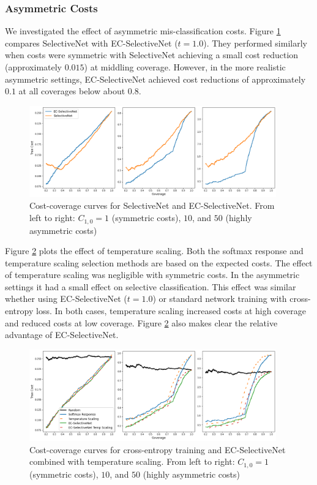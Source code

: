 \subsubsection{Asymmetric Costs}
We investigated the effect of asymmetric mis-classification costs. Figure \ref{fig:sn_costs} compares SelectiveNet with EC-SelectiveNet ($t=1.0$). They performed similarly when costs were symmetric with SelectiveNet achieving a small cost reduction (approximately $0.015$) at middling coverage. However, in the more realistic asymmetric settings, EC-SelectiveNet achieved cost reductions of approximately $0.1$ at all coverages below about $0.8$.

\begin{figure}[h]
	\centering
	\includegraphics[width=0.95\textwidth]{images/selectivenet_cost.png}
	\caption{Cost-coverage curves for SelectiveNet and EC-SelectiveNet. From left to right: $C_{1,0}=1$ (symmetric costs), $10$, and $50$ (highly asymmetric costs)}
	\label{fig:sn_costs}
\end{figure}

Figure \ref{fig:temp_scaling} plots the effect of temperature scaling. Both the softmax response and temperature scaling selection methods are based on the expected costs. The effect of temperature scaling was negligible with symmetric costs. In the asymmetric settings it had a small effect on selective classification. This effect was similar whether using EC-SelectiveNet ($t=1.0$) or standard network training with cross-entropy loss. In both cases, temperature scaling increased costs at high coverage and reduced costs at low coverage. Figure \ref{fig:temp_scaling} also makes clear the relative advantage of EC-SelectiveNet.

\begin{figure}[h]
	\centering
	\includegraphics[width=0.95\textwidth]{images/tmp_scaling_v2.png}
	\caption{Cost-coverage curves for cross-entropy training and EC-SelectiveNet combined with temperature scaling. From left to right: $C_{1,0}=1$ (symmetric costs), $10$, and $50$ (highly asymmetric costs)}
	\label{fig:temp_scaling}
\end{figure}

